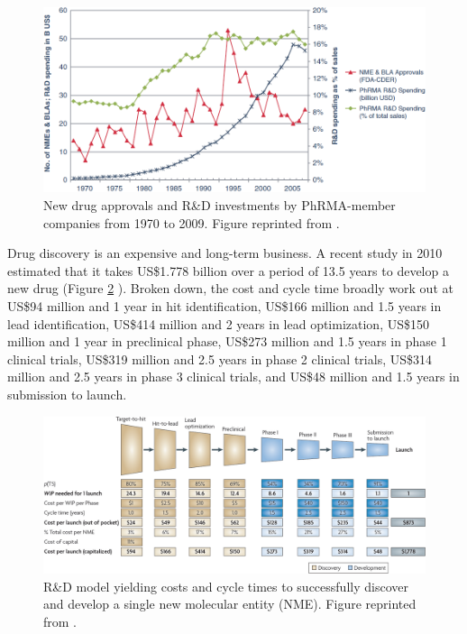 \begin{figure}
\centering
\includegraphics[width=\textwidth]{Figures/NewDrugApprovals.png}
\caption{New drug approvals and R\&D investments by PhRMA-member companies from 1970 to 2009. Figure reprinted from \citep{686}.}
\label{fig:NewDrugApprovals}
\end{figure}

Drug discovery is an expensive and long-term business. A recent study in 2010 estimated that it takes US\$1.778 billion over a period of 13.5 years to develop a new drug (Figure \ref{fig:DrugDiscoveryProcess} \citep{716}). Broken down, the cost and cycle time broadly work out at US\$94 million and 1 year in hit identification, US\$166 million and 1.5 years in lead identification, US\$414 million and 2 years in lead optimization, US\$150 million and 1 year in preclinical phase, US\$273 million and 1.5 years in phase 1 clinical trials, US\$319 million and 2.5 years in phase 2 clinical trials, US\$314 million and 2.5 years in phase 3 clinical trials, and US\$48 million and 1.5 years in submission to launch.

\begin{figure}
\centering
\includegraphics[width=\textwidth]{Figures/DrugDiscoveryProcess.png}
\caption{R\&D model yielding costs and cycle times to successfully discover and develop a single new molecular entity (NME). Figure reprinted from \citep{716}.}
\label{fig:DrugDiscoveryProcess}
\end{figure}

